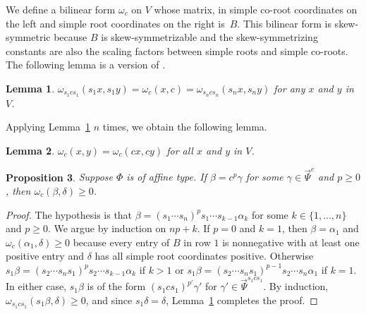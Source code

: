 \documentclass{amsart}
\newtheorem{proposition}{Proposition}[section]
\newtheorem{lemma}[proposition]{Lemma}
\theoremstyle{definition}
\theoremstyle{remark}
\numberwithin{equation}{section}
\newcommand{\set}[1]{{\lbrace #1 \rbrace}}
\newcommand{\0}{{\mathbf{0}}}
\newcommand{\RSChar}{\Phi}
\newcommand{\RS}{\RSChar}
\newcommand{\TravInfChar}{\Psi}
\newcommand{\TravProj}[1]{\overrightarrow{\TravInfChar}^{#1}}
\begin{document}
We define a bilinear form $\omega_c$ on $V$ whose matrix, in simple co-root coordinates on the left and simple root coordinates on the right is~$B$.
This bilinear form is skew-symmetric because $B$ is skew-symmetrizable and the skew-symmetrizing constants are also the scaling factors between simple roots and simple co-roots.
The following lemma is a version of \cite[Lemma~3.8]{typefree}.

\begin{lemma}\label{omega s}
$\omega_{s_1cs_1}(s_1x,s_1y)=\omega_c(x,c)=\omega_{s_ncs_n}(s_nx,s_ny)$ for any $x$ and $y$ in~$V$.
\end{lemma}

Applying Lemma~\ref{omega s} $n$ times, we obtain the following lemma.

\begin{lemma}\label{omega c}
$\omega_c(x,y)=\omega_c(cx,cy)$ for all $x$ and $y$ in $V$.
\end{lemma}

\begin{proposition}\label{om del}
Suppose $\RS$ is of affine type.
If $\beta=c^p\gamma$ for some $\gamma\in\TravProj{c}$ and $p\ge0$, then $\omega_c(\beta,\delta)\ge0$. 
\end{proposition}
\begin{proof}
The hypothesis is that $\beta=(s_1\cdots s_n)^ps_1\cdots s_{k-1}\alpha_k$ for some $k\in\set{1,\ldots,n}$ and $p\ge0$.
We argue by induction on $np+k$.
If $p=0$ and $k=1$, then $\beta=\alpha_1$ and $\omega_c(\alpha_1,\delta)\ge0$ because every entry of $B$ in row $1$ is nonnegative with at least one positive entry and $\delta$ has all simple root coordinates positive.
Otherwise $s_1\beta=(s_2\cdots s_ns_1)^ps_2\cdots s_{k-1}\alpha_k$ if $k>1$ or $s_1\beta=(s_2\cdots s_ns_1)^{p-1}s_2\cdots s_n\alpha_1$ if $k=1$.
In either case, $s_1\beta$ is of the form $(s_1cs_1)^{p'}\gamma'$ for $\gamma'\in\TravProj{s_1cs_1}$.
By induction, $\omega_{s_1cs_1}(s_1\beta,\delta)\ge0$, and since $s_1\delta=\delta$, Lemma~\ref{omega s} completes the proof.
\end{proof}

\end{document}
